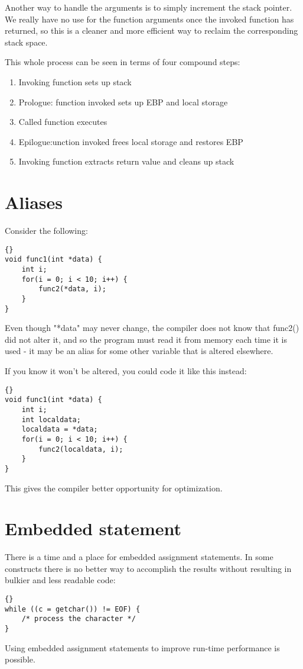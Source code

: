 \documentclass{report}
\begin{document}
Another way to handle the arguments is to simply increment the stack pointer. We really have no use for the function arguments once the invoked function has returned, so this is a cleaner and more efficient way to reclaim the corresponding stack space.

This whole process can be seen in terms of four compound steps:
\begin{enumerate}
\item Invoking function sets up stack
\item Prologue: function invoked sets up EBP and local storage
\item Called function executes
\item Epilogue:unction invoked frees local storage and restores EBP
\item Invoking function extracts return value and cleans up stack
\end{enumerate}

\section{Aliases}
Consider the following: 
\begin{lstlisting}{}
void func1(int *data) {
    int i;
    for(i = 0; i < 10; i++) {
        func2(*data, i);
    }
}
\end{lstlisting}
Even though "*data" may never change, the compiler does not know that func2() did not alter it, and so the program must read it from memory each time it is used - it may be an alias for some other variable that is altered elsewhere.

If you know it won't be altered, you could code it like this instead: 
\begin{lstlisting}{}
void func1(int *data) {
    int i;
    int localdata;
    localdata = *data;
    for(i = 0; i < 10; i++) {
        func2(localdata, i);
    }
}
\end{lstlisting}
This gives the compiler better opportunity for optimization.


\section{Embedded statement}
There is a time and a place for embedded assignment statements. In some constructs there is no better way to accomplish the results without resulting in bulkier and less readable code: 
\begin{lstlisting}{}
while ((c = getchar()) != EOF) {
    /* process the character */
}
\end{lstlisting} 
Using embedded assignment statements to improve run-time performance is possible.
\end{document}

